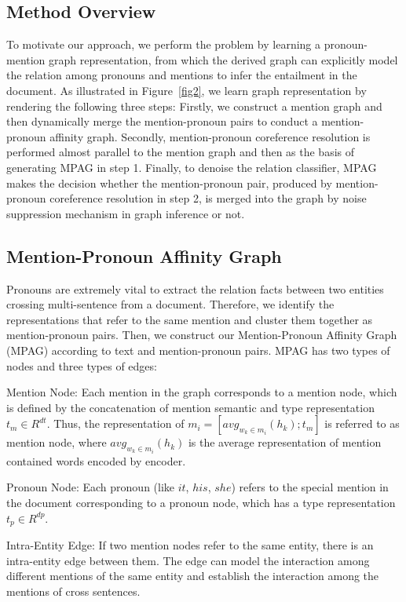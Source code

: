 \documentclass{article}
\begin{document}
\subsection{Method Overview}

To motivate our approach, we perform the problem by learning a pronoun-mention graph representation, from which the derived graph can explicitly model the relation among pronouns and mentions to infer the entailment in the document. As illustrated in Figure~\ref{fig2}, we learn graph representation by rendering the following three steps: Firstly, we construct a mention graph and then dynamically merge the mention-pronoun pairs to conduct a mention-pronoun affinity graph.
Secondly, mention-pronoun coreference resolution is performed almost parallel to the mention graph and then as the basis of generating MPAG in step 1.
Finally, to denoise the relation classifier, MPAG makes the decision whether the mention-pronoun pair, produced by mention-pronoun coreference resolution in step 2, is merged into the graph by noise suppression mechanism in graph inference or not.

\subsection{Mention-Pronoun Affinity Graph}

Pronouns are extremely vital to extract the relation facts between two entities crossing multi-sentence from a document. Therefore, we identify the representations that refer to the same mention and cluster them together as mention-pronoun pairs. Then, we construct our Mention-Pronoun Affinity Graph (MPAG) according to text and mention-pronoun pairs. MPAG has two types of nodes and three types of edges: 

Mention Node: Each mention in the graph corresponds to a mention node, which is defined by the concatenation of mention semantic and type representation $t_{m} \in R^{dt}$. Thus, the representation of $m_{i}=\left[avg_{w_{k} \in m_{i}}\left(h_{k}\right) ; t_{m}\right]$ is referred to as mention node, where $avg_{w_{k} \in m_{i}}\left(h_{k}\right)$ is the average representation of mention contained words encoded by encoder.

Pronoun Node: Each pronoun (like $it$, $his$, $she$) refers to the special mention in the document corresponding to a pronoun node, which has a type representation $t_{p} \in R^{dp}$.

Intra-Entity Edge:  If two mention nodes refer to the same entity, there is an intra-entity edge between them. The edge can model the interaction among different mentions of the same entity and establish the interaction among the mentions of cross sentences.
\end{document}
